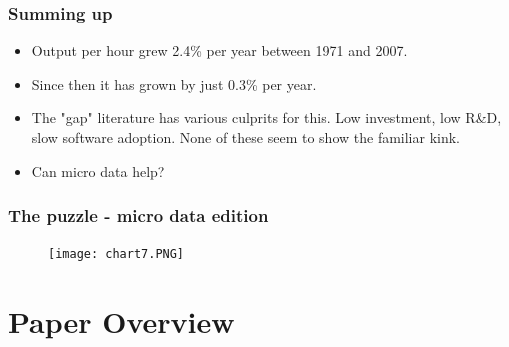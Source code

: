 \documentclass{beamer}
\begin{document}
\begin{frame}
\frametitle{Summing up}

\begin{itemize}
    \item<1-> Output per hour grew 2.4\% per year between 1971 and 2007.
    \item<2-> Since then it has grown by just 0.3\% per year. 
    \item<3-> The "gap" literature has various culprits for this. Low investment, low R&D, slow software adoption. None of these seem to show the familiar kink. 
    \item<4-> Can micro data help?
\end{itemize}

\end{frame}


\begin{frame}
\frametitle{The puzzle - micro data edition}

\begin{figure}
\centering
\texttt{[image: chart7.PNG]}
\end{figure}

\href{https://www.rapidcharts.io/productivity}{}

\end{frame}





\section{Paper Overview}
\end{document}

